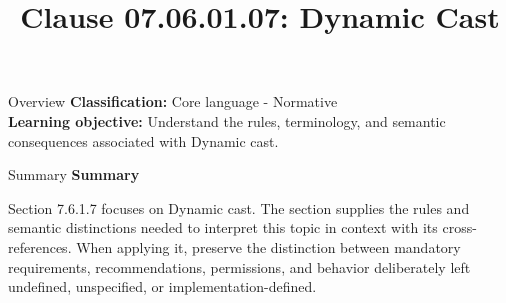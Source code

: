 \documentclass[10pt,letterpaper]{article}
\title{Clause 07.06.01.07: Dynamic Cast}
\author{}
\date{}
\begin{document}
\maketitle
\begin{CornellOverviewBox}{Overview}
\textbf{Classification:} Core language - Normative\\[2pt]
\textbf{Learning objective:} Understand the rules, terminology, and semantic consequences associated with Dynamic cast.
\end{CornellOverviewBox}\begin{CornellSummaryBox}{Summary}
{\sffamily\bfseries\color{Accent} Summary}\par\vspace{3pt}Section 7.6.1.7 focuses on Dynamic cast. The section supplies the rules and semantic distinctions needed to interpret this topic in context with its cross-references. When applying it, preserve the distinction between mandatory requirements, recommendations, permissions, and behavior deliberately left undefined, unspecified, or implementation-defined.
\end{CornellSummaryBox}
\end{document}
